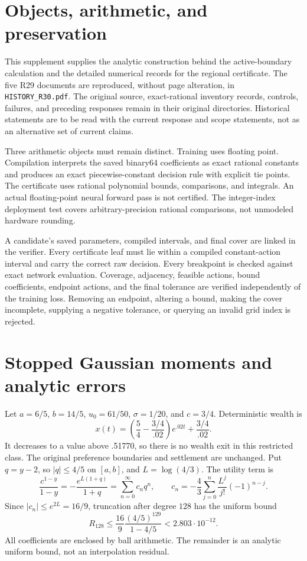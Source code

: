\section{Objects, arithmetic, and preservation}
This supplement supplies the analytic construction behind the active-boundary calculation and the detailed numerical records for the regional certificate. The five R29 documents are reproduced, without page alteration, in \texttt{HISTORY\_R30.pdf}. The original source, exact-rational inventory records, controls, failures, and preceding responses remain in their original directories. Historical statements are to be read with the current response and scope statements, not as an alternative set of current claims.

Three arithmetic objects must remain distinct. Training uses floating point. Compilation interprets the saved binary64 coefficients as exact rational constants and produces an exact piecewise-constant decision rule with explicit tie points. The certificate uses rational polynomial bounds, comparisons, and integrals. An actual floating-point neural forward pass is not certified. The integer-index deployment test covers arbitrary-precision rational comparisons, not unmodeled hardware rounding.

A candidate's saved parameters, compiled intervals, and final cover are linked in the verifier. Every certificate leaf must lie within a compiled constant-action interval and carry the correct raw decision. Every breakpoint is checked against exact network evaluation. Coverage, adjacency, feasible actions, bound coefficients, endpoint actions, and the final tolerance are verified independently of the training loss. Removing an endpoint, altering a bound, making the cover incomplete, supplying a negative tolerance, or querying an invalid grid index is rejected.

\section{Stopped Gaussian moments and analytic errors}\label{app:stopping30}
Let $a=6/5$, $b=14/5$, $u_0=61/50$, $\sigma=1/20$, and $c=3/4$. Deterministic wealth is
\begin{equation}
 x(t)=\left(\frac54-\frac{3/4}{.02}\right)e^{.02t}+\frac{3/4}{.02}.
\end{equation}
It decreases to a value above .51770, so there is no wealth exit in this restricted class. The original preference boundaries and settlement are unchanged. Put $q=y-2$, so $|q|\le4/5$ on $[a,b]$, and $L=\log(4/3)$. The utility term is
\begin{equation}
 \frac{c^{1-y}}{1-y}=-\frac{e^{L(1+q)}}{1+q}=\sum_{n=0}^{\infty}c_nq^n,
 \qquad c_n=-\frac43\sum_{j=0}^n\frac{L^j}{j!}(-1)^{n-j}.
\end{equation}
Since $|c_n|\le e^{2L}=16/9$, truncation after degree $128$ has the uniform bound
\begin{equation}\label{eq:utilityrem30}
 R_{128}\le\frac{16}{9}\frac{(4/5)^{129}}{1-4/5}<2.803\cdot10^{-12}.
\end{equation}
All coefficients are enclosed by ball arithmetic. The remainder is an analytic uniform bound, not an interpolation residual.

